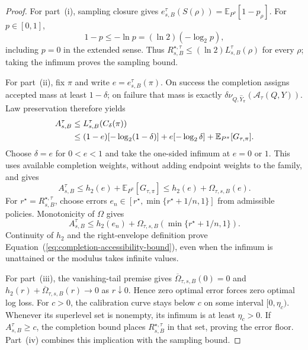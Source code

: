 \documentclass[10pt]{article} %
\renewcommand{\eqref}[1]{\textup{(\ref{#1})}}
\providecommand{\1}{\mathbf{1}}  %
\theoremstyle{remark}
\theoremstyle{definition}
\begin{document}
\begin{proof}

For part~(i), sampling closure gives
$e_{s,B}^{\tau}(S(\rho))=\mathbb E_{P^\rho}[1-p_\rho]$.
For $p\in[0,1]$,
\begin{equation}
1-p\leq-\ln p=(\ln2)(-\log_2p),
\label{eq:log-dominates-error}
\end{equation}
including $p=0$ in the extended sense. Thus
$R_{s,B}^{\star,\tau}\leq(\ln2)L_{s,B}^{\tau}(\rho)$ for every
$\rho$; taking the infimum proves the sampling bound.

For part~(ii), fix $\pi$ and write $e=e_{s,B}^{\tau}(\pi)$.
On success the completion assigns accepted mass at least $1-\delta$;
on failure that mass is exactly
$\delta\nu_{Q,\widehat Y_\pi}(\mathcal A_\tau(Q,Y))$.
Law preservation therefore yields
\begin{align}
A_{s,B}^{\tau}
&\leq L_{s,B}^{\tau}(C_\delta(\pi))\notag\\
&\leq(1-e)[-\log_2(1-\delta)]
 +e[-\log_2\delta]+\mathbb E_{P^\pi}[G_{\tau,\pi}].
\label{eq:fixed-decision-open-completion-loss}
\end{align}
Choose $\delta=e$ for $0<e<1$ and take the one-sided infimum at
$e=0$ or $1$. This uses available completion weights, without adding
endpoint weights to the family, and gives
\begin{equation}
A_{s,B}^{\tau}
\leq h_2(e)+\mathbb E_{P^\pi}[G_{\tau,\pi}]
\leq h_2(e)+\Omega_{\tau,s,B}(e).
\label{eq:fixed-decision-tail-bound}
\end{equation}
For $r^\star=R_{s,B}^{\star,\tau}$, choose errors
$e_n\in[r^\star,\min\{r^\star+1/n,1\}]$ from admissible policies.
Monotonicity of $\Omega$ gives
\[
A_{s,B}^{\tau}\leq h_2(e_n)
+\Omega_{\tau,s,B}(\min\{r^\star+1/n,1\}).
\]
Continuity of $h_2$ and the right-envelope definition prove
Equation~\eqref{eq:completion-accessibility-bound}, even when the
infimum is unattained or the modulus takes infinite values.

For part~(iii), the vanishing-tail premise gives
$\overline\Omega_{\tau,s,B}(0)=0$ and
$h_2(r)+\overline\Omega_{\tau,s,B}(r)\to0$ as $r\downarrow0$.
Hence zero optimal error forces zero optimal log loss. For $c>0$, the
calibration curve stays below $c$ on some interval $[0,\eta_c)$.
Whenever its superlevel set is nonempty, its infimum is at least
$\eta_c>0$. If $A_{s,B}^{\tau}\geq c$, the completion bound places
$R_{s,B}^{\star,\tau}$ in that set, proving the error floor.
Part~(iv) combines this implication with the sampling bound.

\end{proof}
\end{document}
